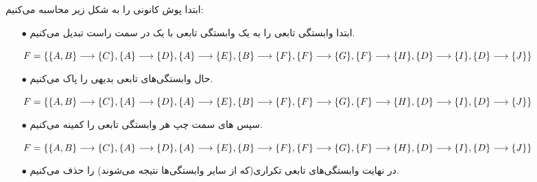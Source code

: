 \documentclass{article}
\begin{document}
\section{}%
ابتدا پوش کانونی را به شکل زیر محاسبه می‌کنیم:
\begin{itemize}
    \item [$\bullet$] ابتدا وابستگی تابعی را به یک وابستگی تابعی با یک  در سمت راست تبدیل می‌کنیم.

\begin{latin}
$
\\F=\\
\{\\
\{A, B\}\longrightarrow\{C\},\\
\{A\}\longrightarrow\{D\},\\
\{A\}\longrightarrow\{E\},\\
\{B\}\longrightarrow\{F\},\\
\{F\}\longrightarrow\{G\},\\
\{F\}\longrightarrow\{H\},\\
\{D\}\longrightarrow\{I\},\\
\{D\}\longrightarrow\{J\}\\
\}
$
\end{latin}
    \item [$\bullet$] حال وابستگی‌های تابعی بدیهی را پاک می‌کنیم.
\begin{latin}
$
\\F=\\
\{\\
\{A, B\}\longrightarrow\{C\},\\
\{A\}\longrightarrow\{D\},\\
\{A\}\longrightarrow\{E\},\\
\{B\}\longrightarrow\{F\},\\
\{F\}\longrightarrow\{G\},\\
\{F\}\longrightarrow\{H\},\\
\{D\}\longrightarrow\{I\},\\
\{D\}\longrightarrow\{J\}\\
\}
$
\end{latin}
    \item [$\bullet$] سپس های سمت چپ هر وابستگی تابعی را کمینه می‌کنیم.

\begin{latin}
$
\\F=\\
\{\\
\{A, B\}\longrightarrow\{C\},\\
\{A\}\longrightarrow\{D\},\\
\{A\}\longrightarrow\{E\},\\
\{B\}\longrightarrow\{F\},\\
\{F\}\longrightarrow\{G\},\\
\{F\}\longrightarrow\{H\},\\
\{D\}\longrightarrow\{I\},\\
\{D\}\longrightarrow\{J\}\\
\}
$
\end{latin}
    \item [$\bullet$] در نهایت وابستگی‌های تابعی تکراری(که از سایر وابستگی‌ها نتیجه می‌شوند) را حذف می‌کنیم.


\end{itemize}
\end{document}
